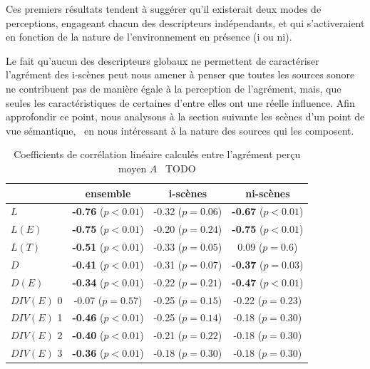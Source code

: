Ces premiers résultats tendent à suggérer qu'il existerait deux modes de perceptions, engageant chacun des descripteurs indépendants, et qui s'activeraient en fonction de la nature de l'environnement en présence (i ou ni). 

Le fait qu'aucun des descripteurs globaux ne permettent de caractériser l'agrément des i-scènes peut nous amener à penser que toutes les sources sonore ne contribuent pas de manière égale à la perception de l'agrément, mais, que seules les caractéristiques de certaines d'entre elles ont une réelle influence. Afin approfondir ce point, nous analysons à la section suivante les scènes d'un point de vue sémantique, \ie~en nous intéressant à la nature des sources qui les composent. \\


\begin{table}[t]
\centering
\begin{tabular}{l c c c} 
            & ensemble                     & i-scènes                   & ni-scènes    \\
\hline
$L$         & \textbf{-0.76} ($p<0.01$)    & -0.32 ($p=0.06$)           & \textbf{-0.67} ($p<0.01$)\\
$L(E)$        & \textbf{-0.75} ($p<0.01$)    & -0.20 ($p=0.24$)           & \textbf{-0.75} ($p<0.01$)\\
$L(T)$        & \textbf{-0.51} ($p<0.01$)    & -0.33 ($p=0.05$)           &  0.09  ($p=0.6$) \\
$D$         & \textbf{-0.41} ($p<0.01$)    & -0.31 ($p=0.07$)           & \textbf{-0.37} ($p=0.03$)\\
$D(E)$        & \textbf{-0.34} ($p<0.01$)    & -0.22 ($p=0.21$)           & \textbf{-0.47} ($p<0.01$)\\
$DIV(E)$ 0     &          -0.07 ($p=0.57$)    & -0.25 ($p=0.15$)           & -0.22 ($p=0.23$)\\
$DIV(E)$ 1     & \textbf{-0.46} ($p<0.01$)    & -0.25 ($p=0.14$)           & -0.18 ($p=0.30$)\\
$DIV(E)$ 2     & \textbf{-0.40} ($p<0.01$)    & -0.21 ($p=0.22$)           & -0.18 ($p=0.30$)\\
$DIV(E)$ 3     & \textbf{-0.36} ($p<0.01$)    & -0.18 ($p=0.30$)           & -0.18 ($p=0.30$)\\
\hline
\end{tabular}
\vspace{0.5mm}
\caption{Coefficients de corrélation linéaire calculés entre l'agrément perçu moyen $A$ \vs~TODO}
\label{tab:corrStructA}
\end{table}


